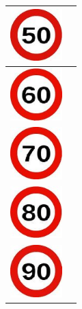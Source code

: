 \begin{table}[H]
\begin{center}
\begin{tabular}{|p{2cm}|p{8cm}|}
      \hline \includegraphics[width=2cm]{./imagenes/5.jpg} & \vspace*{-.8in}{Velocidad fijada a 50*.} \\
      \hline \includegraphics[width=2cm]{./imagenes/6.jpg} & \vspace*{-.8in}{Velocidad fijada a 60*.} \\
      \hline \includegraphics[width=2cm]{./imagenes/7.jpg} & \vspace*{-.8in}{Velocidad fijada a 70*.} \\
      \hline \includegraphics[width=2cm]{./imagenes/8.jpg} & \vspace*{-.8in}{Velocidad fijada a 80*.} \\
      \hline \includegraphics[width=2cm]{./imagenes/9.jpg} & \vspace*{-.8in}{Velocidad fijada a 90*.} \\
      \hline
   \end{tabular}
  \end{center}
\end{table}

